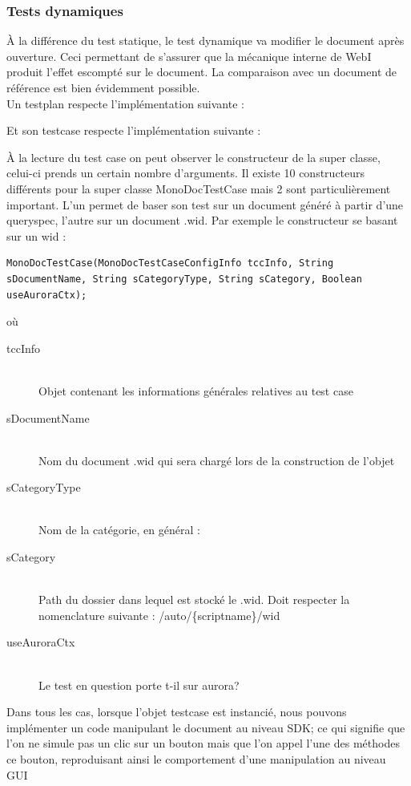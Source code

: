 \subsubsection{Tests dynamiques}

\`{A} la diff\'{e}rence du test statique, le test dynamique va modifier le document apr\`{e}s ouverture. Ceci permettant de s'assurer que la m\'{e}canique interne de WebI produit l'effet escompt\'{e} sur le document. La comparaison avec un document de r\'{e}f\'{e}rence est bien \'{e}videmment possible.\\
Un testplan respecte l'impl\'{e}mentation suivante :





Et son testcase respecte l'impl\'{e}mentation suivante :



\`{A} la lecture du test case on peut observer le constructeur de la super classe, celui-ci prends un certain nombre d'arguments. Il existe 10 constructeurs différents pour la super classe MonoDocTestCase mais 2 sont particulièrement important. L'un permet de baser son test sur un document généré à partir d'une queryspec, l'autre sur un document .wid. Par exemple le constructeur se basant sur un wid :\\
\begin{lstlisting}
MonoDocTestCase(MonoDocTestCaseConfigInfo tccInfo, String sDocumentName, String sCategoryType, String sCategory, Boolean useAuroraCtx);
\end{lstlisting}
où
\begin{description}
	\item[tccInfo] \hfill \\
	Objet contenant les informations générales relatives au test case
	\item[sDocumentName] \hfill \\
	Nom du document .wid qui sera chargé lors de la construction de l'objet
	\item[sCategoryType] \hfill \\
	Nom de la catégorie, en général : 
	\item[sCategory] \hfill \\
	Path du dossier dans lequel est stocké le .wid. Doit respecter la nomenclature suivante : /auto/\{scriptname\}/wid
	\item[useAuroraCtx] \hfill \\
	Le test en question porte t-il sur aurora?
\end{description}
 Dans tous les cas, lorsque l'objet testcase est instancié, nous pouvons implémenter un code manipulant le document au niveau SDK; ce qui signifie que l'on ne simule pas un clic sur un bouton mais que l'on appel l'une des méthodes  ce bouton, reproduisant ainsi le comportement d'une manipulation au niveau GUI



